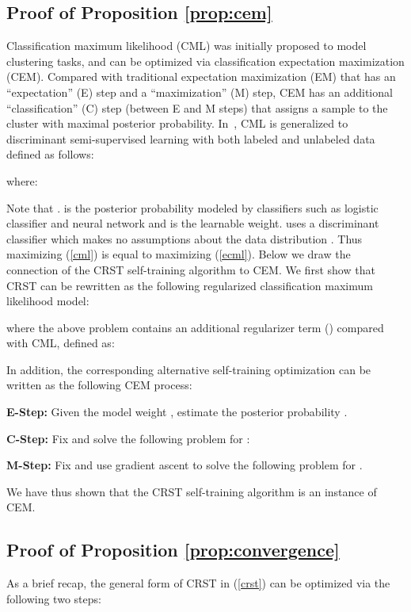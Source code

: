 \documentclass[10pt,twocolumn,letterpaper]{article}
\theoremstyle{plain}
\begin{document}
\subsection{Proof of Proposition \ref{prop:cem}}\label{sec:proofprop1}
Classification maximum likelihood (CML) was initially proposed to model clustering tasks, and can be optimized via classification expectation maximization (CEM). Compared with traditional expectation maximization (EM) that has an ``expectation'' (E) step and a ``maximization'' (M) step, CEM has an additional ``classification'' (C) step (between E and M steps) that assigns a sample to the cluster with maximal posterior probability. In~\cite{amini2002semi}, CML is generalized to discriminant semi-supervised learning with both labeled and unlabeled data defined as follows:

where:

Note that .  is the posterior probability modeled by classifiers such as logistic classifier and neural network and  is the learnable weight. \cite{amini2002semi} uses a discriminant classifier which makes no assumptions about the data distribution . Thus maximizing (\ref{cml}) is equal to maximizing (\ref{ecml}). Below we draw the connection of the CRST self-training algorithm to CEM. We first show that CRST can be rewritten as the following regularized classification maximum likelihood model:

where the above problem contains an additional regularizer term () compared with CML, defined as:

In addition, the corresponding alternative self-training optimization can be written as the following CEM process:

\noindent\textbf{E-Step:} Given the model weight , estimate the posterior probability .

\noindent\textbf{C-Step:} Fix  and solve the following problem for :


\noindent\textbf{M-Step:} Fix  and use gradient ascent to solve the following problem for .

We have thus shown that the CRST self-training algorithm is an instance of CEM.

\subsection{Proof of Proposition \ref{prop:convergence}}\label{sec:proofprop2}
As a brief recap, the general form of CRST in (\ref{crst}) can be optimized via the following two steps:
\end{document}
